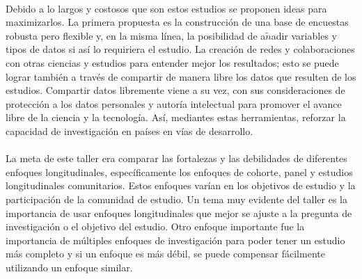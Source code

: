 \documentclass[10pt,spanish,letterpaper]{article}
\theoremstyle{plain}
\begin{document}
\\
Debido a lo largos y costosos que son estos estudios se proponen ideas para maximizarlos. La primera propuesta es la construcci\'on de una base de encuestas robusta pero flexible y, en la misma l\'inea, la posibilidad de a$\tilde{n}$adir variables y tipos de datos si as\'i lo requiriera el estudio. La creaci\'on de redes y colaboraciones con otras ciencias y estudios para entender mejor los resultados; esto se puede lograr tambi\'en a trav\'es de compartir de manera libre los datos que resulten de los estudios. Compartir datos libremente viene a su vez, con sus consideraciones de protecci\'on a los datos personales y autor\'ia intelectual para promover el avance libre de la ciencia y la tecnolog\'ia. As\'i, mediantes estas herramientas, reforzar la capacidad de investigaci\'on en pa\'ises en v\'ias de desarrollo.\\
\\
La meta de este taller era comparar las fortalezas y las debilidades de diferentes enfoques longitudinales, espec\'ificamente los enfoques de cohorte, panel y estudios longitudinales comunitarios.  Estos enfoques var\'ian en los objetivos de estudio y la participaci\'on de la comunidad de estudio. Un tema muy evidente del taller es la importancia de usar enfoques longitudinales que mejor se ajuste a la pregunta de investigaci\'on o el objetivo del estudio. Otro enfoque importante fue la importancia de m\'ultiples enfoques de investigaci\'on para poder tener un estudio m\'as completo y si un enfoque es m\'as  d\'ebil, se puede compensar f\'acilmente utilizando un enfoque similar.  


\end{document}
